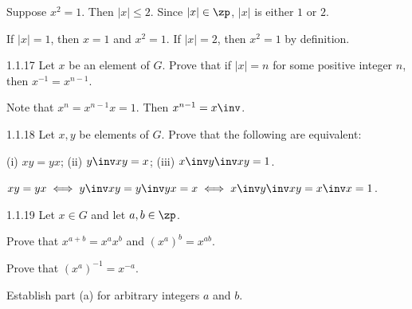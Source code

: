 \begin{soliff}
    \rightimp Suppose $x^2 = 1$.
	Then $|x| \leq 2$.
	Since $|x| \in \zp$, $|x|$ is either $1$ or $2$.

    \leftimp If $|x| = 1$, then $x = 1$ and $x^2 = 1$.
	If $|x| = 2$, then $x^2 = 1$ by definition.
\end{soliff}

\begin{exercise}{1.1.17}
    Let $x$ be an element of $G$.
	Prove that if $|x| = n$ for some positive integer $n$, then $x^{-1} = x^{n-1}$.
\end{exercise}

\begin{sol}
    Note that $x^n = x^{n - 1}x = 1$.
	Then $x^{n - 1} = x\inv$.
\end{sol}

\begin{exercise}{1.1.18}
    Let $x, y$ be elements of $G$.
	Prove that the following are equivalent:

    (i) $xy = yx$; \quad (ii) $y\inv xy = x$; \quad (iii) $x\inv y\inv xy = 1$.
\end{exercise}

\begin{sol}
    $xy = yx \iff y\inv xy = y\inv yx = x \iff x\inv y\inv xy = x\inv x = 1$.
\end{sol}

\begin{spex}{1.1.19}
    Let $x \in G$ and let $a, b \in \zp$.
    \begin{subexercises}
        \item Prove that $x^{a+b} = x^a x^b$ and $(x^a)^b = x^{ab}$.
        \item Prove that $(x^a)^{-1} = x^{-a}$.
        \item Establish part (a) for arbitrary integers $a$ and $b$.
    \end{subexercises}
\end{spex}


